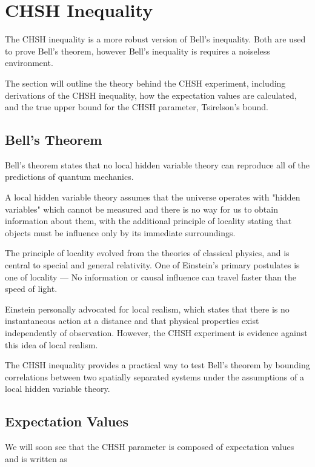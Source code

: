\documentclass[12pt]{article}
\begin{document}
\newpage
\section{CHSH Inequality}

The CHSH inequality is a more robust version of Bell's inequality. Both are used to prove Bell's theorem, however Bell's inequality is requires a noiseless environment.

The section will outline the theory behind the CHSH experiment, including derivations of the CHSH inequality, how the expectation values are calculated, and the true upper bound for the CHSH parameter, Tsirelson's bound.

\subsection{Bell's Theorem}

Bell's theorem states that no local hidden variable theory can reproduce all of the predictions of quantum mechanics. \cite{Bell1964}

A local hidden variable theory assumes that the universe operates with "hidden variables" which cannot be measured and there is no way for us to obtain information about them, with the additional principle of locality stating that objects must be influence only by its immediate surroundings.

The principle of locality evolved from the theories of classical physics, and is central to special and general relativity. One of Einstein's primary postulates is one of locality — No information or causal influence can travel faster than the speed of light.

Einstein personally advocated for local realism, which states that there is no instantaneous action at a distance and that physical properties exist independently of observation. However, the CHSH experiment is evidence against this idea of local realism.

The CHSH inequality provides a practical way to test Bell's theorem by bounding correlations between two spatially separated systems under the assumptions of a local hidden variable theory. \cite{CHSH1969}

\subsection{Expectation Values}

We will soon see that the CHSH parameter is composed of expectation values and is written as
\end{document}
